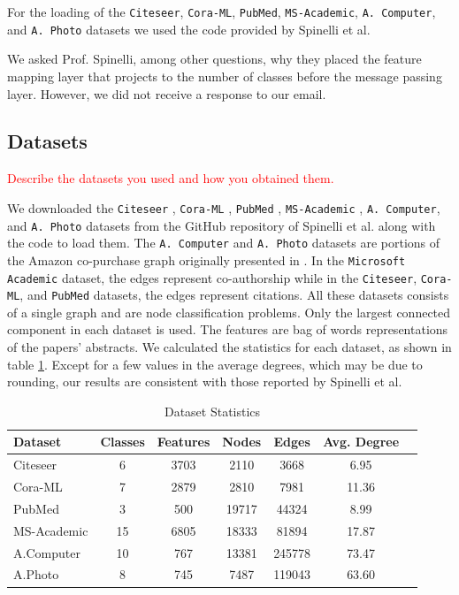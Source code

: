 \documentclass{gdl}
\begin{document}
For the loading of the \texttt{Citeseer}, \texttt{Cora-ML}, \texttt{PubMed}, \texttt{MS-Academic}, \texttt{A. Computer}, and \texttt{A. Photo} datasets we used the code provided by Spinelli et al.

We asked Prof. Spinelli, among other questions, why they placed the feature mapping layer that projects to the number of classes before the message passing layer. However, we did not receive a response to our email.

\subsection{Datasets}
\textcolor{red}{Describe the datasets you used and how you obtained them. }

We downloaded the \texttt{Citeseer} \cite{sen2008}, \texttt{Cora-ML} \cite{mccallum2000}, \texttt{PubMed} \cite{namata2012}, \texttt{MS-Academic} \cite{shchur2018}, \texttt{A. Computer}, and \texttt{A. Photo} datasets from the GitHub repository of Spinelli et al. along with the code to load them. The \texttt{A. Computer} and \texttt{A. Photo} datasets are portions of the Amazon co-purchase graph originally presented in \cite{mcauley2015}. In the \texttt{Microsoft Academic} dataset, the edges represent co-authorship while in the \texttt{Citeseer}, \texttt{Cora-ML}, and \texttt{PubMed} datasets, the edges represent citations. All these datasets consists of a single graph and are node classification problems. Only the largest connected component in each dataset is used. The features are bag of words representations of the papers' abstracts. We calculated the statistics for each dataset, as shown in table \ref{tab:dataset_statistics}. Except for a few values in the average degrees, which may be due to rounding, our results are consistent with those reported by Spinelli et al.

\begin{table}[h]
    \small\sf
    \setlength{\tabcolsep}{2pt}
    \caption{Dataset Statistics}
    \begin{tabular}{l c c c c c c}
        \toprule
        Dataset & Classes & Features & Nodes & Edges & Avg. Degree \\
        \midrule
        Citeseer & 6 & 3703 & 2110 & 3668 & 6.95 \\
        Cora-ML & 7 & 2879 & 2810 & 7981 & 11.36 \\
        PubMed & 3 & 500 & 19717 &44324 &8.99 \\
        MS-Academic & 15&6805 & 18333 & 81894 & 17.87 \\
        A.Computer & 10 & 767 & 13381 & 245778 & 73.47 \\
        A.Photo  & 8 & 745 & 7487 & 119043 & 63.60 \\
        \bottomrule
    \end{tabular}
    \label{tab:dataset_statistics}
\end{table}
\end{document}
